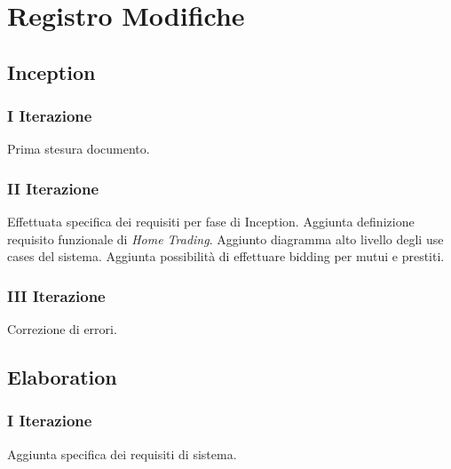 \documentclass[10pt]{softeng} %
\begin{document}
\startofdocument{}











\appendix

\section{Registro Modifiche}

\subsection{Inception}

\subsubsection{I Iterazione}

Prima stesura documento.

\subsubsection{II Iterazione}

Effettuata specifica dei requisiti per fase di Inception.
Aggiunta definizione requisito funzionale di \emph{Home Trading}.
Aggiunto diagramma alto livello degli use cases del sistema.
Aggiunta possibilit\`a di effettuare bidding per mutui e prestiti.

\subsubsection{III Iterazione}

Correzione di errori.

\subsection{Elaboration}

\subsubsection{I Iterazione}

Aggiunta specifica dei requisiti di sistema.


\printcustombib{}
\end{document}
